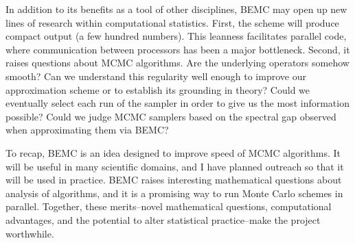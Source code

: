 \documentclass[11pt,letterpaper]{article}
\begin{document}
In addition to its benefits as a tool of other disciplines, BEMC may open up new lines of research within computational statistics. First, the scheme will produce compact output (a few hundred numbers). This leanness facilitates parallel code, where communication between processors has been a major bottleneck. Second, it raises questions about MCMC algorithms. Are the underlying operators somehow smooth? Can we understand this regularity well enough to improve our approximation scheme or to establish its grounding in theory? Could we eventually select each run of the sampler in order to give us the most information possible? Could we judge MCMC samplers based on the spectral gap observed when approximating them via BEMC?

To recap, BEMC is an idea designed to improve speed of MCMC algorithms. It will be useful in many scientific domains, and I have planned outreach so that it will be used in practice. BEMC raises interesting mathematical questions about analysis of algorithms, and it is a promising way to run Monte Carlo schemes in parallel. Together, these merits--novel mathematical questions, computational advantages, and the potential to alter statistical practice--make the project worthwhile. 

%
%
%

%
\end{document}
